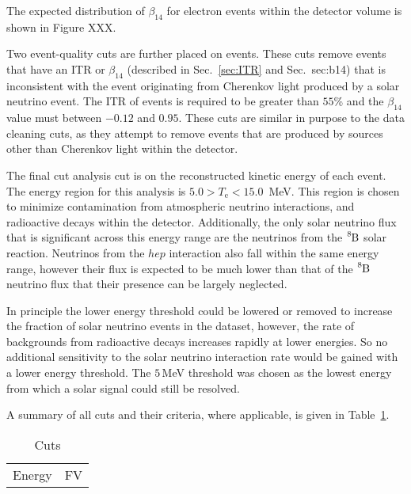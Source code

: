 The expected distribution of $\beta_{14}$ for electron events within the
detector volume is shown in Figure XXX.


Two event-quality cuts are further placed on events. These cuts remove events
that have an ITR or $\beta_{14}$ (described in Sec.~\ref{sec:ITR} and Sec.~{sec:b14})
that is inconsistent with the event originating from Cherenkov light produced
by a solar neutrino event.
The ITR of events is required to be greater than $55$\% and the $\beta_{14}$
value must between $-0.12$ and $0.95$.
These cuts are similar in purpose to the data cleaning cuts, as they attempt to
remove events that are produced by sources other than Cherenkov light within
the detector.

The final cut analysis cut is on the reconstructed kinetic energy of each event.
The energy region for this analysis is $5.0 > T_{\mathrm{e}} < 15.0$\, MeV.
This region is chosen to minimize contamination from atmospheric neutrino
interactions, and radioactive decays within the detector.
Additionally, the only solar neutrino flux that is significant across this energy range
are the neutrinos from the $\ce{^{8}B}$ solar reaction.
Neutrinos from the $hep$ interaction also fall within the same energy range,
however their flux is expected to be much lower than that of the $\ce{^{8}B}$
neutrino flux that their presence can be largely neglected.

In principle the lower energy threshold could be lowered or removed to
increase the fraction of solar neutrino events in the dataset, however,
the rate of backgrounds from radioactive decays increases rapidly at lower
energies. So no additional sensitivity to the solar neutrino interaction
rate would be gained with a lower energy threshold.
The $5$\,MeV threshold was chosen as the lowest energy from which a solar
signal could still be resolved.

A summary of all cuts and their criteria, where applicable, is given in Table~\ref{tbl:event_selection}.

\begin{table}
    \centering
  \begin{tabular}{c  c}
        Energy & FV\\
    \end{tabular}
    \caption{Cuts}
\label{tbl:event_selection}
\end{table}

